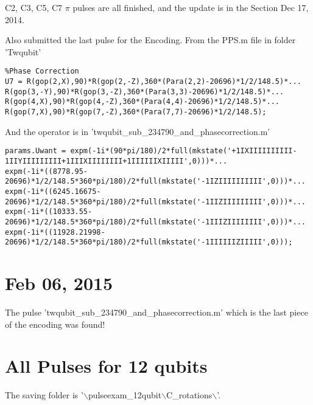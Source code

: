 \documentclass[prl,onecolumn]{revtex4-1}
\newcommand{\dir}{$\backslash$}
\begin{document}
C2, C3, C5, C7 $\pi$ pulses are all finished, and the update is in the Section Dec 17, 2014. 

Also submitted the last pulse for the Encoding. From the PPS.m file in folder 'Twqubit'
\begin{lstlisting}
%Phase Correction
U7 = R(gop(2,X),90)*R(gop(2,-Z),360*(Para(2,2)-20696)*1/2/148.5)*...
R(gop(3,-Y),90)*R(gop(3,-Z),360*(Para(3,3)-20696)*1/2/148.5)*...
R(gop(4,X),90)*R(gop(4,-Z),360*(Para(4,4)-20696)*1/2/148.5)*...
R(gop(7,X),90)*R(gop(7,-Z),360*(Para(7,7)-20696)*1/2/148.5);
\end{lstlisting}

And the operator is in 'twqubit\_sub\_234790\_and\_phasecorrection.m' 
\begin{lstlisting}
params.Uwant = expm(-1i*(90*pi/180)/2*full(mkstate('+1IXIIIIIIIIII-1IIYIIIIIIIII+1IIIXIIIIIIII+1IIIIIIXIIIII',0)))*...
expm(-1i*((8778.95-20696)*1/2/148.5*360*pi/180)/2*full(mkstate('-1IZIIIIIIIIII',0)))*...
expm(-1i*((6245.16675-20696)*1/2/148.5*360*pi/180)/2*full(mkstate('-1IIZIIIIIIIII',0)))*...
expm(-1i*((10333.55-20696)*1/2/148.5*360*pi/180)/2*full(mkstate('-1IIIZIIIIIIII',0)))*...
expm(-1i*((11928.21998-20696)*1/2/148.5*360*pi/180)/2*full(mkstate('-1IIIIIIZIIIII',0))); 
\end{lstlisting}

\newpage
\section{Feb 06, 2015}

The pulse 'twqubit\_sub\_234790\_and\_phasecorrection.m' which is the last piece of the encoding was found!






\newpage
\section{All Pulses for 12 qubits}

The saving folder is '\dir pulseexam\_12qubit\dir C\_rotations\dir'. 
\end{document}

